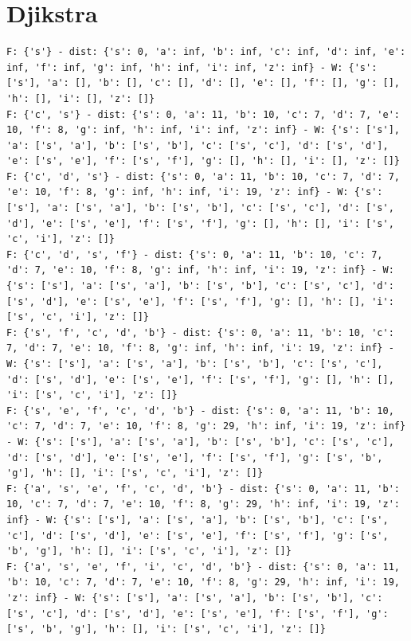 \documentclass[a4paper,11pt]{report}
\begin{document}
\section{Djikstra}\label{sec:djikstra}
\begin{verbatim}
F: {'s'} - dist: {'s': 0, 'a': inf, 'b': inf, 'c': inf, 'd': inf, 'e': inf, 'f': inf, 'g': inf, 'h': inf, 'i': inf, 'z': inf} - W: {'s': ['s'], 'a': [], 'b': [], 'c': [], 'd': [], 'e': [], 'f': [], 'g': [], 'h': [], 'i': [], 'z': []}
F: {'c', 's'} - dist: {'s': 0, 'a': 11, 'b': 10, 'c': 7, 'd': 7, 'e': 10, 'f': 8, 'g': inf, 'h': inf, 'i': inf, 'z': inf} - W: {'s': ['s'], 'a': ['s', 'a'], 'b': ['s', 'b'], 'c': ['s', 'c'], 'd': ['s', 'd'], 'e': ['s', 'e'], 'f': ['s', 'f'], 'g': [], 'h': [], 'i': [], 'z': []}
F: {'c', 'd', 's'} - dist: {'s': 0, 'a': 11, 'b': 10, 'c': 7, 'd': 7, 'e': 10, 'f': 8, 'g': inf, 'h': inf, 'i': 19, 'z': inf} - W: {'s': ['s'], 'a': ['s', 'a'], 'b': ['s', 'b'], 'c': ['s', 'c'], 'd': ['s', 'd'], 'e': ['s', 'e'], 'f': ['s', 'f'], 'g': [], 'h': [], 'i': ['s', 'c', 'i'], 'z': []}
F: {'c', 'd', 's', 'f'} - dist: {'s': 0, 'a': 11, 'b': 10, 'c': 7, 'd': 7, 'e': 10, 'f': 8, 'g': inf, 'h': inf, 'i': 19, 'z': inf} - W: {'s': ['s'], 'a': ['s', 'a'], 'b': ['s', 'b'], 'c': ['s', 'c'], 'd': ['s', 'd'], 'e': ['s', 'e'], 'f': ['s', 'f'], 'g': [], 'h': [], 'i': ['s', 'c', 'i'], 'z': []}
F: {'s', 'f', 'c', 'd', 'b'} - dist: {'s': 0, 'a': 11, 'b': 10, 'c': 7, 'd': 7, 'e': 10, 'f': 8, 'g': inf, 'h': inf, 'i': 19, 'z': inf} - W: {'s': ['s'], 'a': ['s', 'a'], 'b': ['s', 'b'], 'c': ['s', 'c'], 'd': ['s', 'd'], 'e': ['s', 'e'], 'f': ['s', 'f'], 'g': [], 'h': [], 'i': ['s', 'c', 'i'], 'z': []}
F: {'s', 'e', 'f', 'c', 'd', 'b'} - dist: {'s': 0, 'a': 11, 'b': 10, 'c': 7, 'd': 7, 'e': 10, 'f': 8, 'g': 29, 'h': inf, 'i': 19, 'z': inf} - W: {'s': ['s'], 'a': ['s', 'a'], 'b': ['s', 'b'], 'c': ['s', 'c'], 'd': ['s', 'd'], 'e': ['s', 'e'], 'f': ['s', 'f'], 'g': ['s', 'b', 'g'], 'h': [], 'i': ['s', 'c', 'i'], 'z': []}
F: {'a', 's', 'e', 'f', 'c', 'd', 'b'} - dist: {'s': 0, 'a': 11, 'b': 10, 'c': 7, 'd': 7, 'e': 10, 'f': 8, 'g': 29, 'h': inf, 'i': 19, 'z': inf} - W: {'s': ['s'], 'a': ['s', 'a'], 'b': ['s', 'b'], 'c': ['s', 'c'], 'd': ['s', 'd'], 'e': ['s', 'e'], 'f': ['s', 'f'], 'g': ['s', 'b', 'g'], 'h': [], 'i': ['s', 'c', 'i'], 'z': []}
F: {'a', 's', 'e', 'f', 'i', 'c', 'd', 'b'} - dist: {'s': 0, 'a': 11, 'b': 10, 'c': 7, 'd': 7, 'e': 10, 'f': 8, 'g': 29, 'h': inf, 'i': 19, 'z': inf} - W: {'s': ['s'], 'a': ['s', 'a'], 'b': ['s', 'b'], 'c': ['s', 'c'], 'd': ['s', 'd'], 'e': ['s', 'e'], 'f': ['s', 'f'], 'g': ['s', 'b', 'g'], 'h': [], 'i': ['s', 'c', 'i'], 'z': []}

\end{verbatim}
\end{document}

